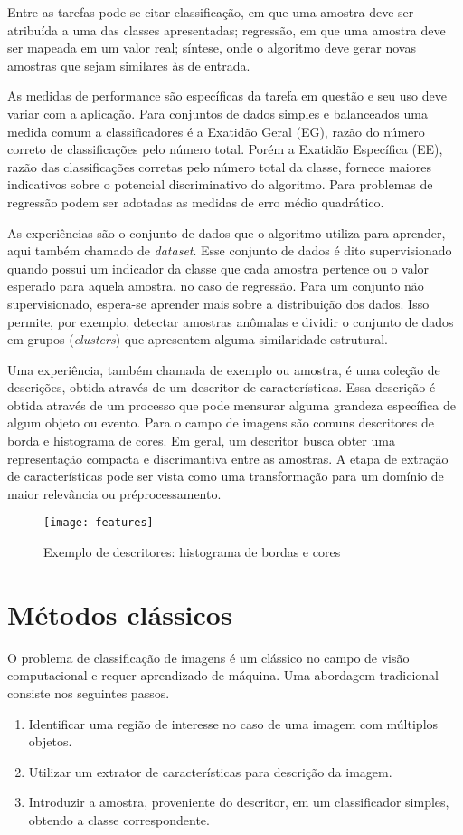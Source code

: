 Entre as tarefas pode-se citar classificação, em que uma amostra deve ser atribuída a uma das classes apresentadas; regressão, em que uma amostra deve ser mapeada em um valor real; síntese, onde o algoritmo deve gerar novas amostras que sejam similares às de entrada.

As medidas de performance são específicas da tarefa em questão e seu uso deve variar com a aplicação. Para conjuntos de dados simples e balanceados uma medida comum a classificadores é a Exatidão Geral (EG), razão do número correto de classificações pelo número total. Porém a Exatidão Específica (EE), razão das classificações corretas pelo número total da classe, fornece maiores indicativos sobre o potencial discriminativo do algoritmo. Para problemas de regressão podem ser adotadas as medidas de erro médio quadrático.

As experiências são o conjunto de dados que o algoritmo utiliza para aprender, aqui também chamado de \textit{dataset}. Esse conjunto de dados é dito supervisionado quando possui um indicador da classe que cada amostra pertence ou o valor esperado para aquela amostra, no caso de regressão. Para um conjunto não supervisionado, espera-se aprender mais sobre a distribuição dos dados. Isso permite, por exemplo, detectar amostras anômalas e dividir o conjunto de dados em grupos (\textit{clusters}) que apresentem alguma similaridade estrutural.

Uma experiência, também chamada de exemplo ou amostra, é uma coleção de descrições, obtida através de um descritor de características. Essa descrição é obtida através de um processo que pode mensurar alguma grandeza específica de algum objeto ou evento. Para o campo de imagens são comuns descritores de borda e histograma de cores. Em geral, um descritor busca obter uma representação compacta e discrimantiva entre as amostras. A etapa de extração de características pode ser vista como uma transformação para um domínio de maior relevância ou préprocessamento.

\begin{figure}[h]
\caption{Exemplo de descritores: histograma de bordas e cores}
\centering
\texttt{[image: features]}
\label{fig:features}
\end{figure}

\section{Métodos clássicos}
O problema de classificação de imagens é um clássico no campo de visão computacional e requer aprendizado de máquina. Uma abordagem tradicional consiste nos seguintes passos.
	\begin{enumerate}
	\item Identificar uma região de interesse no caso de uma imagem com múltiplos objetos.
	\item Utilizar um extrator de características para descrição da imagem.
	\item Introduzir a amostra, proveniente do descritor, em um classificador simples, obtendo a classe correspondente.
	\end{enumerate}


